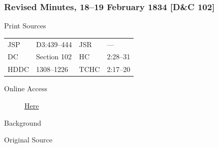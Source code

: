 		\subsubsection{Revised Minutes, 18--19 February 1834 [D\&C 102]}
			\label{EMS-1834-JS-18-19-FEB-1834}
			
			\begin{description}
					\item[Print Sources]
				\end{description}

					\begin{tabular}{p{0.5in}p{1in}p{0.5in}p{1in}}
					JSP	 	& D3:439--444		& JSR 		& --- \\
					DC	 	& Section 102 		& HC 		& 2:28--31 \\
					HDDC 	& 1308--1226		& TCHC 		& 2:17--20 \\
					\end{tabular}
				
				\begin{description}
					\item[Online Access] \href{https://www.josephsmithpapers.org/paper-summary/revised-minutes-18-19-february-1834-dc-102/1}{Here}
				\end{description}
				
				\begin{description}
					\item[Background]
				\end{description}
				
				
				\begin{description}
					\item[Original Source]
				\end{description}
				
				
